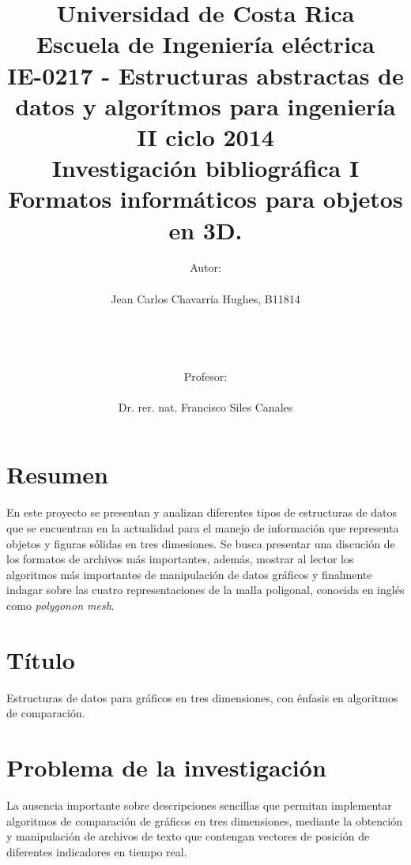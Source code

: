 \documentclass[11pt,letterpaper]{article}     %
\author{Autor: \\ \\Jean Carlos Chavarría Hughes, B11814\\ \\ \\ \\ \\Profesor:\\ \\Dr. rer. nat. Francisco Siles Canales \vspace*{2.0in}}
\title{Universidad de Costa Rica\\{\small Escuela de Ingeniería eléctrica\\ IE-0217 - Estructuras abstractas de datos y algor\' itmos para ingeniería\\II ciclo 2014\\\vspace*{0.55in} Investigación bibliográfica I}\\ Formatos informáticos para objetos en 3D.
\vspace*{1.35in}}
\begin{document}

\maketitle
\newpage
\tableofcontents
\newpage
\listoffigures
\newpage

\section{Resumen}
En este proyecto se presentan y analizan diferentes tipos de estructuras de datos que se encuentran en la actualidad para el manejo de informaci\' on que representa objetos y figuras s\' olidas en tres dimesiones. Se busca presentar una discuci\' on de los formatos de archivos m\' as importantes, adem\' as, mostrar al lector los algoritmos m\' as importantes de manipulaci\' on de datos gr\' aficos y finalmente indagar sobre las cuatro representaciones de la malla poligonal, conocida en ingl\' es como \textit{polygonon mesh}.


\section{T\' itulo}
Estructuras de datos para gr\' aficos en tres dimensiones, con \' enfasis en algoritmos de comparaci\' on.

\section{Problema de la investigaci\' on}
La ausencia importante sobre descripciones sencillas que permitan implementar algoritmos de comparaci\' on de gr\' aficos en tres dimensiones, mediante la obtenci\' on y manipulaci\' on de archivos de texto que contengan vectores de posici\' on de diferentes indicadores en tiempo real. 
\end{document}
